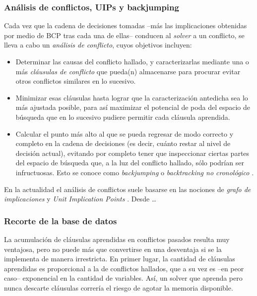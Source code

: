 \subsubsection{Análisis de conflictos, UIPs y backjumping}

Cada vez que la cadena de decisiones tomadas --más las implicaciones obtenidas por medio de BCP tras cada una de ellas-- conducen al \emph{solver} a un conflicto, se lleva a cabo un \emph{análisis de conflicto}, cuyos objetivos incluyen:

\begin{itemize}

\item Determinar las causas del conflicto hallado, y caracterizarlas mediante una o más \emph{cláusulas de conflicto} que pueda(n) almacenarse para procurar evitar otros conflictos similares en lo sucesivo.

\item Minimizar esas cláusulas hasta lograr que la caracterización antedicha sea lo más ajustada posible, para así maximizar el potencial de poda del espacio de búsqueda que en lo sucesivo pudiere permitir cada cláusula aprendida. %

\item  Calcular el punto más alto al que se pueda regresar de modo correcto y completo en la cadena de decisiones (es decir, cuánto restar al nivel de decisión actual), evitando por completo tener que inspeccionar ciertas partes del espacio de búsqueda que, a la luz del conflicto hallado, sólo podrían ser infructuosas. Esto se conoce como \emph{backjumping} o \emph{backtracking no cronológico} \cite{marques-silva:iccad96} \cite{moskewicz:da01}.

\end{itemize}

En la actualidad el análisis de conflictos suele basarse en las nociones de \emph{grafo de implicaciones} y \emph{Unit Implication Points} \cite{marques-silva:iccad96}. Desde \ldots


\subsubsection{Recorte de la base de datos}

La acumulación de cláusulas aprendidas en conflictos pasados resulta muy ventajosa, pero no puede más que convertirse en una desventaja si se la implementa de manera irrestricta. En primer lugar, la cantidad de cláusulas aprendidas es proporcional a la de conflictos hallados, que a su vez es --en peor caso-- exponencial en la cantidad de variables. Así, un solver que aprenda pero nunca descarte cláusulas correría el riesgo de agotar la memoria disponible.

